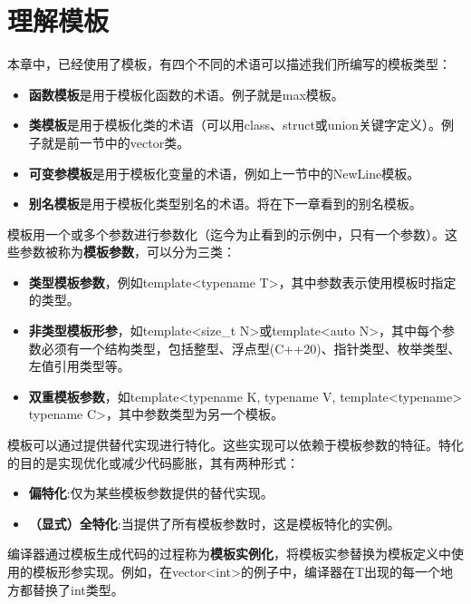 \section{理解模板}
本章中，已经使用了模板，有四个不同的术语可以描述我们所编写的模板类型：

\begin{itemize}
\item
\textbf{函数模板}是用于模板化函数的术语。例子就是max模板。

\item
\textbf{类模板}是用于模板化类的术语（可以用class、struct或union关键字定义）。例子就是前一节中的vector类。

\item
\textbf{可变参模板}是用于模板化变量的术语，例如上一节中的NewLine模板。

\item
\textbf{别名模板}是用于模板化类型别名的术语。将在下一章看到的别名模板。
\end{itemize}

模板用一个或多个参数进行参数化（迄今为止看到的示例中，只有一个参数）。这些参数被称为\textbf{模板参数}，可以分为三类：

\begin{itemize}
\item
\textbf{类型模板参数}，例如template<typename T>，其中参数表示使用模板时指定的类型。

\item
\textbf{非类型模板形参}，如template<size\_t N>或template<auto N>，其中每个参数必须有一个结构类型，包括整型、浮点型(C++20)、指针类型、枚举类型、左值引用类型等。

\item
\textbf{双重模板参数}，如template<typename K, typename V, template<typename> typename C>，其中参数类型为另一个模板。
\end{itemize}

模板可以通过提供替代实现进行特化。这些实现可以依赖于模板参数的特征。特化的目的是实现优化或减少代码膨胀，其有两种形式：

\begin{itemize}
\item
\textbf{偏特化}:仅为某些模板参数提供的替代实现。

\item
\textbf{（显式）全特化}:当提供了所有模板参数时，这是模板特化的实例。
\end{itemize}

编译器通过模板生成代码的过程称为\textbf{模板实例化}，将模板实参替换为模板定义中使用的模板形参实现。例如，在vector<int>的例子中，编译器在T出现的每一个地方都替换了int类型。

